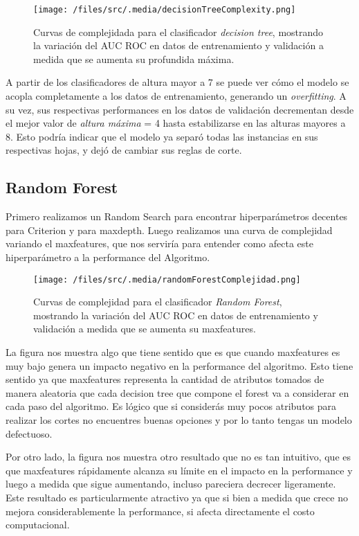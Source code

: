 \begin{figure}[!htbp]
    \centering
    \texttt{[image: /files/src/.media/decisionTreeComplexity.png]}
    \caption{Curvas de complejidada para el clasificador \textit{decision tree}, mostrando la variación del AUC ROC en datos de entrenamiento y validación a medida que se aumenta su profundida máxima.}
    \label{SVMComplexity}
\end{figure}

A partir de los clasificadores de altura mayor a 7 se puede ver cómo el modelo se  acopla completamente a los datos de entrenamiento, generando un \textit{overfitting}. A su vez, sus respectivas performances en los datos de validación decrementan desde el mejor valor de \textit{altura máxima} = 4 hasta estabilizarse en las alturas mayores a 8. Esto podría indicar que el modelo ya separó todas las instancias en sus respectivas hojas, y dejó de cambiar sus reglas de corte. 

\subsection{Random Forest}

Primero realizamos un Random Search para encontrar hiperparámetros decentes para Criterion y para maxdepth. Luego realizamos una curva de complejidad variando el maxfeatures, que nos serviría para entender como afecta este hiperparámetro a la performance del Algoritmo. 

\begin{figure}[!htbp]
    \centering
    \texttt{[image: /files/src/.media/randomForestComplejidad.png]}
    \caption{Curvas de complejidad para el clasificador \textit{Random Forest}, mostrando la variación del AUC ROC en datos de entrenamiento y validación a medida que se aumenta su maxfeatures.}
    \label{RFComplexity}
\end{figure}



La figura nos muestra algo que tiene sentido que es que cuando maxfeatures es muy bajo genera un impacto negativo en la performance del algoritmo. Esto tiene sentido ya que maxfeatures representa la cantidad de atributos tomados de manera aleatoria que cada decision tree que compone el forest va a considerar en cada paso del algoritmo. Es lógico que si considerás muy pocos atributos para realizar los cortes no encuentres buenas opciones y por lo tanto tengas un modelo defectuoso.

Por otro lado, la figura nos muestra otro resultado que no es tan intuitivo, que es que maxfeatures rápidamente alcanza su límite en el impacto en la performance y luego a medida que sigue aumentando, incluso pareciera decrecer ligeramente. Este resultado es particularmente atractivo ya que si bien a medida que crece no mejora considerablemente la performance, si afecta directamente el costo computacional. 

